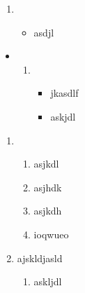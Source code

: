 \documentclass{xyz}
\begin{document}
    \begin{enumerate}
        \item {
        \begin{itemize}
            \item {
            asdjl
            }
        \end{itemize}
        }
    \end{enumerate}

    \begin{itemize}
        \item {
        \begin{enumerate}
            \item {
            \begin{itemize}
                \item jkasdlf
                \item {
                askjdl
                }
            \end{itemize}
            }
        \end{enumerate}
        }
    \end{itemize}

    \begin{enumerate}
        \item {
        \begin{enumerate}
            \item asjkdl
            \item {
            asjhdk
            }
            \item {asjkdh}
            \item {
            ioqwueo
            }
        \end{enumerate}
        }
        \item {
        ajskldjasld
        }
        \begin{enumerate}
            \item askljdl
        \end{enumerate}
    \end{enumerate}
\end{document}
